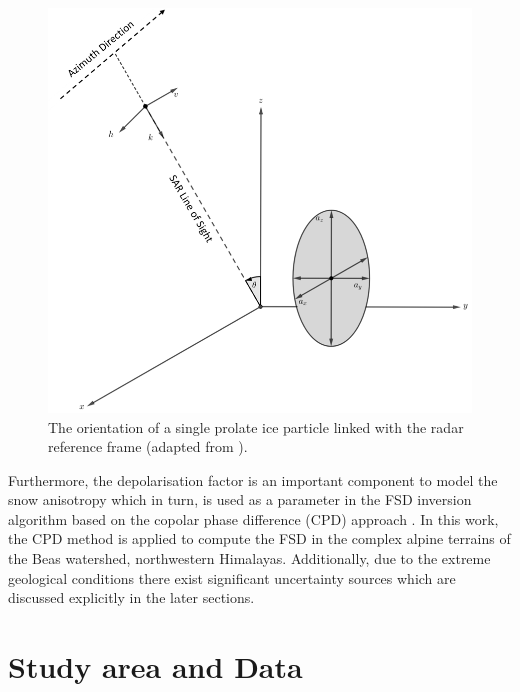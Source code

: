 \documentclass{article}
\begin{document}
\begin{figure}[htb]
\centering
\includegraphics[scale=0.2]{Prolate_New.png}
\vspace{-1.5ex}
\caption{The orientation of a single prolate ice particle linked with the radar reference frame (adapted from \cite{Leinss2014}).}
\label{fig:prolate}
\end{figure}

Furthermore, the depolarisation factor is an important component to model the snow anisotropy which in turn, is used as a parameter in the FSD inversion algorithm based on the copolar phase difference (CPD) approach \cite{Leinss2014}. In this work, the CPD method is applied to compute the FSD in the complex alpine terrains of the Beas watershed, northwestern Himalayas. Additionally, due to the extreme geological conditions there exist significant uncertainty sources which are discussed explicitly in the later sections.

\section{Study area and Data}
\label{sec:study}
\end{document}
